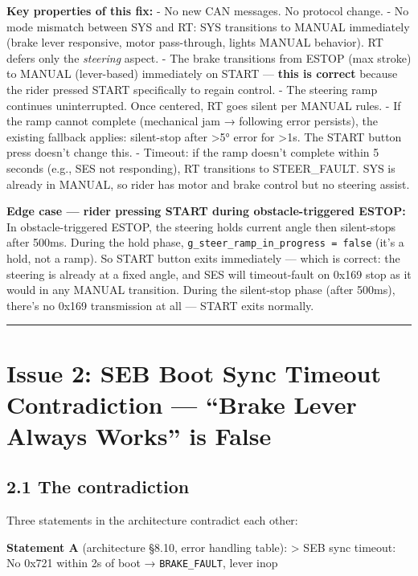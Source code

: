 \documentclass[12pt,a4paper,oneside]{report}
\begin{document}
\textbf{Key properties of this fix:} - No new CAN messages. No protocol change.
- No mode mismatch between SYS and RT: SYS transitions to MANUAL immediately
(brake lever responsive, motor pass-through, lights MANUAL behavior). RT defers
only the \emph{steering} aspect. - The brake transitions from ESTOP (max stroke)
to MANUAL (lever-based) immediately on START --- \textbf{this is correct}
because the rider pressed START specifically to regain control. - The steering
ramp continues uninterrupted. Once centered, RT goes silent per MANUAL rules. -
If the ramp cannot complete (mechanical jam → following error persists), the
existing fallback applies: silent-stop after \textgreater5° error for
\textgreater1s. The START button press doesn't change this. - Timeout: if the
ramp doesn't complete within 5 seconds (e.g., SES not responding), RT
transitions to STEER\_FAULT. SYS is already in MANUAL, so rider has motor and
brake control but no steering assist.

\textbf{Edge case --- rider pressing START during obstacle-triggered ESTOP:} In
obstacle-triggered ESTOP, the steering holds current angle then silent-stops
after 500ms. During the hold phase,
\texttt{g\_steer\_ramp\_in\_progress\ =\ false} (it's a hold, not a ramp). So
START button exits immediately --- which is correct: the steering is already at
a fixed angle, and SES will timeout-fault on 0x169 stop as it would in any
MANUAL transition. During the silent-stop phase (after 500ms), there's no 0x169
transmission at all --- START exits normally.

\begin{center}\rule{0.5\linewidth}{0.5pt}\end{center}

\section{Issue 2: SEB Boot Sync Timeout Contradiction --- ``Brake Lever Always
Works'' is
False}\label{issue-2-seb-boot-sync-timeout-contradiction-brake-lever-always-works-is-false}

\subsection{2.1 The contradiction}\label{the-contradiction}

Three statements in the architecture contradict each other:

\textbf{Statement A} (architecture §8.10, error handling table): \textgreater{}
SEB sync timeout: No 0x721 within 2s of boot → \texttt{BRAKE\_FAULT}, lever inop
\end{document}
